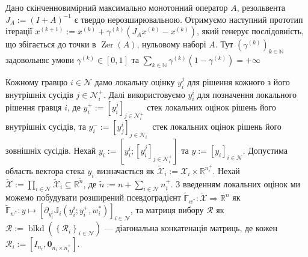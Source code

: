 \documentclass[a4paper]{article}
\begin{document}
Дано скінченновимірний максимально монотонний оператор $A$, резольвента $J_{A}:=(I+A)^{-1}$  є твердо нерозширювальною. Отримуємо наступний прототип ітерації $x^{(k+1)}:=x^{(k)}+\gamma^{(k)}\left(J_{A} x^{(k)}-x^{(k)}\right)$, який генерує послідовність, що збігається до точки в $\operatorname{Zer}(A)$, нульовому наборі $A$. Тут $\left(\gamma^{(k)}\right)_{k \in \mathbb{N}}$ задовольняє умови $\gamma^{(k)} \in[0,1]$ та $\sum_{k \in \mathbb{N}} \gamma^{(k)}\left(1-\gamma^{(k)}\right)=+\infty$

Кожному гравцю $i \in \mathcal{N}$ дамо локальну оцінку $y_{i}^{j}$ для рішення кожного з його внутрішніх сусідів $j \in \mathcal{N} _{i}^{+}$. Далі використовуємо $y_{i}^{i}$ для позначення локального рішення гравця $i$, де $y_{i}^{+}:= [y_{i}^{j}]_{j \in \mathcal{N}_{i}^{+}}$ стек локальних оцінок рішень його внутрішніх сусідів, та $y_{i}^{-}:= [y_{j}^{i}]_{j \in \mathcal{N}_{i}^{-}}$ стек локальних оцінок рішень його зовнішніх сусідів. Нехай $y_{i}:=[y_{i}^{i} ;[y_{i}^{j}]_{j \in \mathcal{N}_{i}^{ +}}]$ та $y:=[y_{i}]_{i \in \mathcal{N}}$. Допустима область вектора стека $y_{i}$ визначається як $\tilde{\mathcal{X}}_{i}:=\mathcal{X}_{i} \times \mathbb{R}^{ n_{i}^{+}}$. Нехай $\tilde{\mathcal{X}}:=\prod_{i \in \mathcal{N}} \tilde{\mathcal{X}}_{i} \subseteq \mathbb{R}^{\tilde{ n}}$, де $\tilde{n}:=n+\sum_{i \in \mathcal{N}} n_{i}^{+}$. З введенням локальних оцінок ми можемо побудувати розширений псевдоградієнт $\tilde{\mathbb{F}}_{w^{*}}: \tilde{\mathcal{X}} \Rightarrow \mathbb{R} ^{n}$ як $\tilde{\mathbb{F}}_{w^{*}}: y \mapsto\left[\partial_{y_{i}^{i}} \mathbb{J}_{i}\left(y_{i}^{i} ; y_{i}^{+}, w_{i}^{*}\right)\right]_{i \in \mathcal{N}}$, та матриця вибору $\mathcal{R}$ як $\mathcal{R}:=\operatorname{blkd}\left(\left\{\mathcal{R}_{i}\right\}_{i \in \mathcal{N}}\right)$ --- діагональна конкатенація матриць, де кожен $\mathcal{R}_{i}:=[I_{n_{i}}, \mathbf{0}_{n_{i} \times n_ {i}^{+}}]$.
\end{document}
